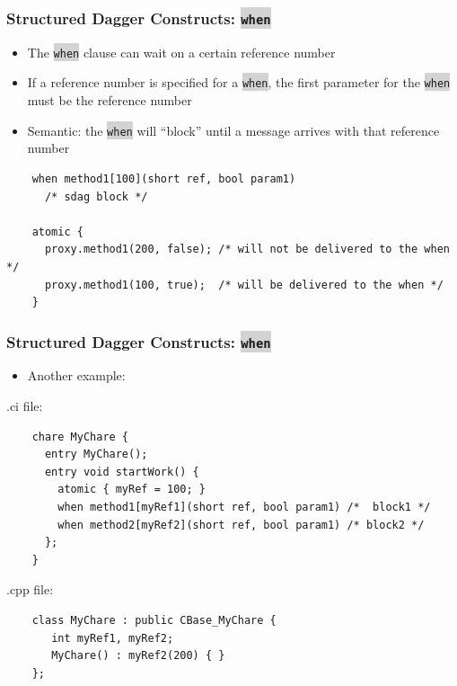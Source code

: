 \documentclass{beamer}
\newcommand{\code}[1]{\colorbox{lightgray}{\texttt{#1}}}
\begin{document}
\begin{frame}[fragile]
  \frametitle{Structured Dagger Constructs: \code{when}}
  \begin{itemize}
    \item The \code{when} clause can wait on a certain reference number
    \item If a reference number is specified for a \code{when}, the first
      parameter for the \code{when} must be the reference number
    \item Semantic: the \code{when} will ``block'' until a message arrives with
      that reference number
  \end{itemize}
  \begin{lstlisting}
    when method1[100](short ref, bool param1)
      /* sdag block */

    atomic {
      proxy.method1(200, false); /* will not be delivered to the when */
      proxy.method1(100, true);  /* will be delivered to the when */
    }
  \end{lstlisting}
\end{frame}

\begin{frame}[fragile]
  \frametitle{Structured Dagger Constructs: \code{when}}
  \begin{itemize}
  \item Another example:
  \end{itemize}
  .ci file:
  \begin{lstlisting}
    chare MyChare {
      entry MyChare();
      entry void startWork() {
        atomic { myRef = 100; }
        when method1[myRef1](short ref, bool param1) /*  block1 */
        when method2[myRef2](short ref, bool param1) /* block2 */
      };
    }
  \end{lstlisting}
  .cpp file:
  \begin{lstlisting}
    class MyChare : public CBase_MyChare {
       int myRef1, myRef2;
       MyChare() : myRef2(200) { }
    };
  \end{lstlisting}
\end{frame}
\end{document}
